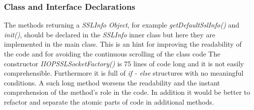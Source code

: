 \subsubsection{Class and Interface Declarations}
\begin{itemize}
		The methods returning a \textit{SSLInfo Object}, for example \textit{getDefaultSslInfo()} and \textit{init()}, should be declared in the \textit{SSLInfo} inner class but here they are implemented in the main class. 
		This is an hint for improving the readability of the code and for avoiding the continuous scrolling of the class code
		The constructor \textit{IIOPSSLSocketFactory()} is 75 lines of code long and it is not easily comprehensible.
		Furthermore it is full of \textit{if - else} structures with no meaningful conditions.
		A such long method worsens the readability and the instant comprehension of the method's role in the code.
		In addition it would be better to refactor and separate the atomic parts of code in additional methods.
\end{itemize}
%
